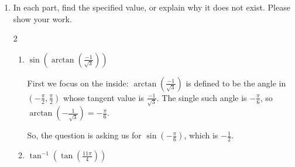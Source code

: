 \documentclass{article}
\begin{document}
\begin{enumerate}
\begin{enumerate}
    \begin{solution}
      \begin{center}
      \end{center}
    \end{solution}

  \end{enumerate}

  \pspace{\newpage}

\item \label{spring2010-midterm2-7} 
  
  In each part, find the specified value, or explain why it does not
  exist.  Please show your work. 

  \begin{multicols}{2}
  \begin{enumerate}
  \item
    \begin{problem}
      $
      \sin\!\left(\arctan(\frac{-1}{\sqrt{3}})\right)$ 
    \end{problem}
    \pspace{1.5in}

    \begin{solution} 
      First we focus on the inside:
      $\arctan\left(\frac{-1}{\sqrt{3}}\right)$ is defined to be the angle
      in $\left( - \frac{\pi}{2}, \frac{\pi}{2} \right)$ whose tangent
      value is $\frac{-1}{\sqrt{3}}$.  The single such angle is
      $-\frac{\pi}{6}$, so $\arctan \left( - \frac{1}{\sqrt{3}} \right) =
      - \frac{\pi}{6}$.

      So, the question is asking us for $\sin \left( - \frac{\pi}{6}
      \right)$, which is $\boxed{- \frac{1}{2}}$. 
    \end{solution}

  \item
    \begin{problem}
      $
      \tan^{-1}\!\left(\tan(\frac{11\pi}{4})\right)$
    \end{problem}
    \pspace{1.5in}


\end{enumerate}
\end{multicols}
\end{enumerate}
\end{document}
